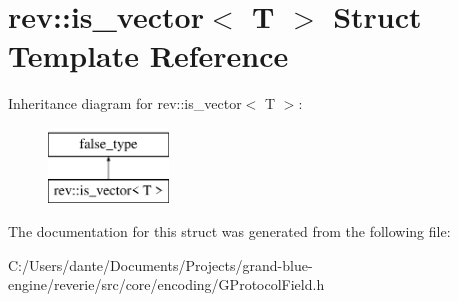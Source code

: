 \hypertarget{structrev_1_1is__vector}{}\section{rev\+::is\+\_\+vector$<$ T $>$ Struct Template Reference}
\label{structrev_1_1is__vector}
Inheritance diagram for rev\+::is\+\_\+vector$<$ T $>$\+:\begin{figure}[H]
\begin{center}
\leavevmode
\includegraphics[height=2.000000cm]{structrev_1_1is__vector}
\end{center}
\end{figure}


The documentation for this struct was generated from the following file\+:\begin{DoxyCompactItemize}
\item 
C\+:/\+Users/dante/\+Documents/\+Projects/grand-\/blue-\/engine/reverie/src/core/encoding/G\+Protocol\+Field.\+h\end{DoxyCompactItemize}
